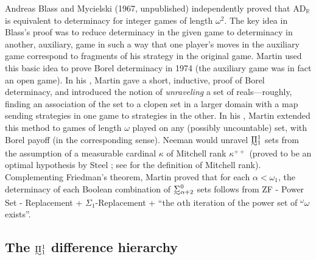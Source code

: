 \documentclass{book}%
\newcommand{\breals}{{^{\omega}}\omega}
\def\underTilde#1{{\baselineskip=0pt\vtop{\hbox{$#1$}\hbox{$\sim$}}}{}}
\newcommand{\uTPi}{\underTilde{\Pi}}
\newcommand{\uTSigma}{\underTilde{\Sigma}}
\begin{document}
Andreas Blass  and
Mycielski (1967, unpublished) independently
proved that AD$_{\mathbb{R}}$ is equivalent to determinacy for
integer games of length $\omega^{2}$. The key idea in
Blass's proof was to reduce determinacy in the
given game to determinacy in another, auxiliary, game in such a way
that one player's moves in the auxiliary game correspond to
fragments of his strategy in the original game. Martin  used this basic idea to prove Borel
determinacy in 1974 (the auxiliary game was in fact an open game).
In his , Martin gave a
short, inductive, proof of Borel determinacy, and introduced the
notion of \emph{unraveling} a set of reals---roughly, finding an
association of the set to a clopen set in a larger domain with a map
sending strategies in one game to strategies in the other. In his
, Martin extended this method to games of
length $\omega$ played on any (possibly uncountable) set, with Borel
payoff (in the corresponding sense). Neeman
 would unravel
$\uTPi^{1}_{1}$ sets from the assumption of a measurable cardinal
$\kappa$ of Mitchell rank $\kappa^{++}$ (proved to be an optimal
hypothesis by Steel ; see
\cite[pp.~357-360]{Jech:settheory} for the definition of Mitchell
rank). Complementing Friedman's theorem, Martin
proved that for each $\alpha <
\omega_{1}$, the determinacy of each Boolean combination of $\uTSigma^0_{\alpha  +2}$ sets
follows
from ZF - Power Set  - Replacement + $\Sigma_{1}$-Replacement + ``the
$\alpha$th iteration of the power set of $\breals$ exists''.

\subsection{The $\uTPi^{1}_{1}$ difference hierarchy}\label{dhier}
\end{document}
